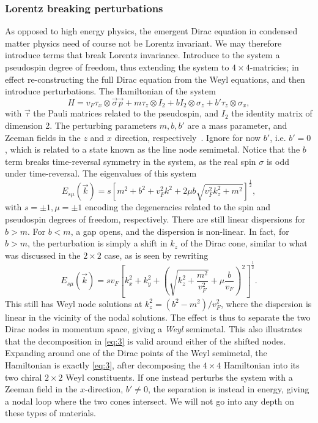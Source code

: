\subsubsection{Lorentz breaking perturbations}
As opposed to high energy physics, the emergent Dirac equation in condensed matter physics need of course not be Lorentz invariant.
We may therefore introduce terms that break Lorentz invariance.
Introduce to the system a pseudospin degree of freedom, thus extending the system to $4\times 4$-matricies;
in effect re-constructing the full Dirac equation from the Weyl equations, and then introduce perturbations.
The Hamiltonian of the system
\begin{equation}
  \label{eq:5}
  H = v_F \tau _x \otimes \vec{\sigma} \vec{p} + m \tau _z \otimes I_2 + b I_2 \otimes \sigma _z + b' \tau _z \otimes \sigma _x,
\end{equation}
with $\vec{\tau}$ the Pauli matrices related to the pseudospin, and $I_2$ the identity matrix of dimension 2.
The perturbing parameters $m, b, b'$ are a mass parameter, and Zeeman fields in the $z$ and $x$ direction, respectively~\cite{armitageWeylDiracSemimetals2018}.
Ignore for now $b'$, i.e. $b' = 0$, which is related to a state known as the line node semimetal.
Notice that the $b$ term breaks time-reversal symmetry in the system, as the real spin $\sigma $ is odd under time-reversal.
The eigenvalues of this system~\cite{armitageWeylDiracSemimetals2018}
\begin{equation}
  E_{s \mu }(\vec{k}) = s \left[
    m^2 + b^2 + v_{F}^2k^2 + 2 \mu  b \sqrt{v_F^2 k_z^2 + m^2}
  \right]^{\frac{1}{2}},
\end{equation}
with $s=\pm 1, \mu = \pm 1$ encoding the degeneracies related to the spin and pseudospin degrees of freedom, respectively.
There are still linear dispersions for $b > m$.
For $b < m$, a gap opens, and the dispersion is non-linear.
In fact, for \( b > m \), the perturbation is simply a shift in $k_z$ of the Dirac cone, similar to what was discussed in the \( 2\times 2 \) case, as  is seen by rewriting
\begin{equation}
  E_{s \mu }(\vec{k}) = s v_F
  \left[
    k_x^2 + k_y^2 + \left( \sqrt{k_z^2 +  \frac{m^2}{v_{F}^2}} + \mu \frac{b}{v_{F}} \right)^2
  \right]^{\frac{1}{2}}.
\end{equation}
This still has Weyl node solutions at $k_z^2 = (b^2-m^2) /v_F^2$, where the dispersion is linear in the vicinity of the nodal solutions.
The effect is thus to separate the two Dirac nodes in momentum space, giving a \emph{Weyl} semimetal.
This also illustrates that the decomposition in \cref{eq:3} is valid around either of the shifted nodes.
Expanding around one of the Dirac points of the Weyl semimetal, the Hamiltonian is exactly \cref{eq:3}, after decomposing the $4 \times 4$ Hamiltonian into its two chiral  $2\times 2$ Weyl constituents.
If one instead perturbs the system with a Zeeman field in the $x$-direction, $b' \neq 0$, the separation is instead in energy, giving a nodal loop where the two cones intersect.
We will not go into any depth on these types of materials.

